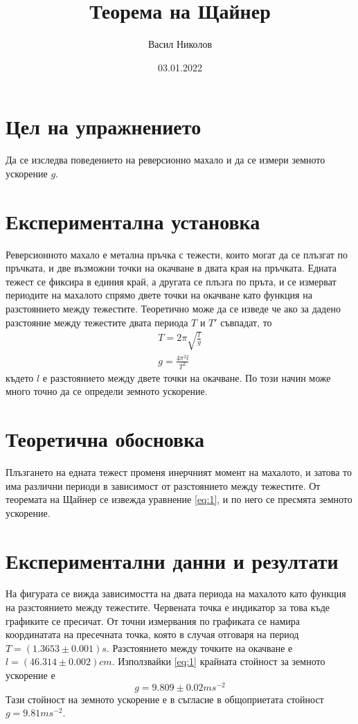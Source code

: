 \documentclass[aps, prb, twocolumn, a4paper, floatfix, reprint]{revtex4-2}
\begin{document}
\title{Теорема на Щайнер}
\author{Васил Николов}
\noaffiliation
\date{03.01.2022}
\maketitle

\section{Цел на упражнението}
Да се изследва поведението на реверсионно махало и да се измери земното ускорение $g$.

\section{Експериментална установка}
Реверсионното махало е метална пръчка с тежести, които могат да се плъзгат по пръчката, и две възможни точки на окачване в двата края на пръчката. Едната тежест се фиксира в единия край, а другата се плъзга по пръта, и се измерват периодите на махалото спрямо двете точки на окачване като функция на разстоянието между тежестите. Теоретично може да се изведе че ако за дадено разстояние между тежестите двата периода $T$ и $T'$ съвпадат, то
\begin{gather*} 
    T = 2\pi \sqrt{\frac{l}{g}} \\
    g = \frac{4\pi^2 l}{T^2} \label{eq:1} \tag{1}
\end{gather*}
където $l$ е разстоянието между двете точки на окачване. По този начин може много точно да се определи земното ускорение.  

\section{Теоретична обосновка}
Плъзгането на едната тежест променя инерчният момент на махалото, и затова то има различни периоди в зависимост от разстоянието между тежестите. От теоремата на Щайнер се извежда уравнение \eqref{eq:1}, и по него се пресмята земното ускорение. 

\section{Експериментални данни и резултати}


На фигурата се вижда зависимостта на двата периода на махалото като функция на разстоянието между тежестите. Червената точка е индикатор за това къде графиките се пресичат. От точни измервания по графиката се намира координатата на пресечната точка, която в случая отговаря на период $T=(1.3653 \pm 0.001)s$. Разстоянието между точките на окачване е $l=(46.314 \pm 0.002)cm$. Използвайки \eqref{eq:1} крайната стойност за земното ускорение е 
\begin{equation*}
    g = 9.809 \pm 0.02 ms^{-2} 
\end{equation*} 
Тази стойност на земното ускорение е в съгласие в общоприетата стойност $g=9.81 ms^{-2}$.
\end{document}
